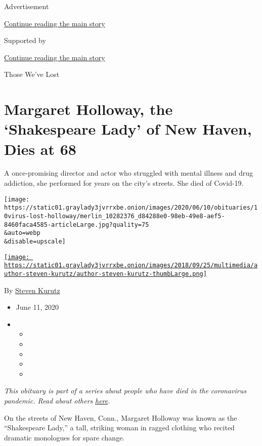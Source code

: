 Advertisement

\protect\hyperlink{after-top}{Continue reading the main story}

Supported by

\protect\hyperlink{after-sponsor}{Continue reading the main story}

Those We've Lost

\hypertarget{margaret-holloway-the-shakespeare-lady-of-new-haven-dies-at-68}{%
\section{Margaret Holloway, the `Shakespeare Lady' of New Haven, Dies at
68}\label{margaret-holloway-the-shakespeare-lady-of-new-haven-dies-at-68}}

A once-promising director and actor who struggled with mental illness
and drug addiction, she performed for years on the city's streets. She
died of Covid-19.

\texttt{[image: https://static01.graylady3jvrrxbe.onion/images/2020/06/10/obituaries/10virus-lost-holloway/merlin\_10282376\_d84288e0-98eb-49e8-aef5-8460faca4585-articleLarge.jpg?quality=75\\\&auto=webp\\\&disable=upscale]}

\href{https://www.nytimes3xbfgragh.onion/by/steven-kurutz}{\texttt{[image: https://static01.graylady3jvrrxbe.onion/images/2018/09/25/multimedia/author-steven-kurutz/author-steven-kurutz-thumbLarge.png]}}

By \href{https://www.nytimes3xbfgragh.onion/by/steven-kurutz}{Steven
Kurutz}

\begin{itemize}
\item
  June 11, 2020
\item
  \begin{itemize}
  \item
  \item
  \item
  \item
  \item
  \end{itemize}
\end{itemize}

\emph{This obituary is part of a series about people who have died in
the coronavirus pandemic. Read about others}
\href{https://www.nytimes3xbfgragh.onion/interactive/2020/obituaries/people-died-coronavirus-obituaries.html}{\emph{here}}\emph{.}

On the streets of New Haven, Conn., Margaret Holloway was known as the
``Shakespeare Lady,'' a tall, striking woman in ragged clothing who
recited dramatic monologues for spare change.

